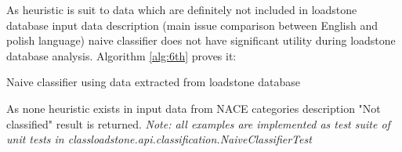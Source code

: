 As heuristic is suit to data which are definitely not included in loadstone database input data description (main issue comparison between English and polish language) naive classifier does not have significant utility during loadstone database analysis. Algorithm \ref{alg:6th} proves it:
\begin{algorithm}
	
	\hfill \break
	\caption{Naive classifier using data extracted from loadstone database}
	\label{alg:5th}
\end{algorithm}
\newline  
As none heuristic exists in input data from NACE categories description "Not classified" result is returned.
\newline
\textit{Note: all examples are implemented as test suite of unit tests in class\newline loadstone.api.classification.NaiveClassifierTest}    
